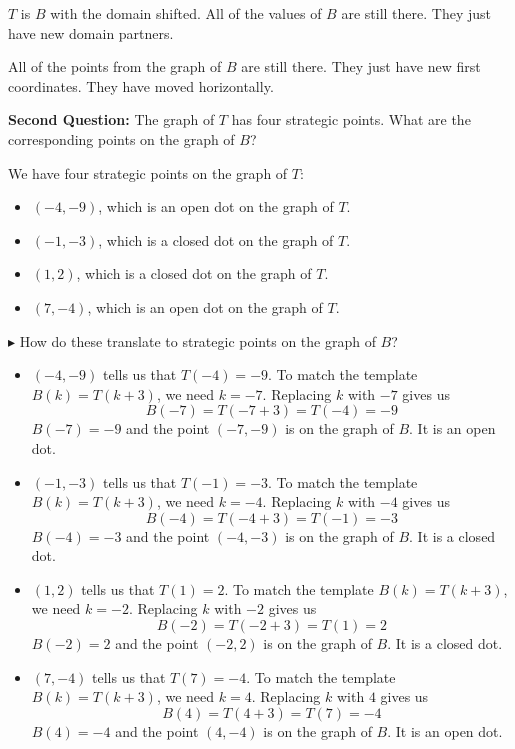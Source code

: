 \documentclass{ximera}
\begin{document}
$T$ is $B$ with the domain shifted. All of the values of $B$ are still there. They just have new domain partners.  

All of the points from the graph of $B$ are still there.  They just have new first coordinates.  They have moved horizontally.



\textbf{\textcolor{purple!85!blue}{Second Question:}}  The graph of $T$ has four strategic points.  What are the corresponding points on the graph of $B$?


We have four strategic points on the graph of $T$: 

\begin{itemize}

\item $(-4, -9)$, which is an open dot on the graph of $T$.
\item $(-1, -3)$, which is a closed dot on the graph of $T$.
\item $(1, 2)$, which is a closed dot on the graph of $T$.
\item $(7, -4)$, which is an open dot on the graph of $T$.

\end{itemize}


\textbf{\textcolor{blue!55!black}{$\blacktriangleright$}} How do these translate to strategic points on the graph of $B$?


\begin{itemize}

\item $(-4, -9)$ tells us that $T(-4) = -9$.   
To match the template $B(k) = T(k+3)$, we need $k=-7$.  Replacing $k$ with $-7$ gives us
\[ B(-7) = T(-7 + 3) = T(-4) = -9\]
$B(-7) = -9$ and the point $(-7, -9)$ is on the graph of $B$. It is an open dot. 


\item $(-1, -3)$ tells us that $T(-1) = -3$.   
To match the template $B(k) = T(k+3)$, we need $k=-4$.  Replacing $k$ with $-4$ gives us
\[ B(-4) = T(-4 + 3) = T(-1) = -3\]
$B(-4) = -3$ and the point $(-4, -3)$ is on the graph of $B$. It is a closed dot. 


\item $(1, 2)$ tells us that $T(1) = 2$.   
To match the template $B(k) = T(k+3)$, we need $k=-2$.  Replacing $k$ with $-2$ gives us
\[ B(-2) = T(-2 + 3) = T(1) = 2\]
$B(-2) = 2$ and the point $(-2, 2)$ is on the graph of $B$. It is a closed dot. 


\item $(7, -4)$ tells us that $T(7) = -4$.   
To match the template $B(k) = T(k+3)$, we need $k=4$.  Replacing $k$ with $4$ gives us
\[ B(4) = T(4 + 3) = T(7) = -4\]
$B(4) = -4$ and the point $(4, -4)$ is on the graph of $B$. It is an open dot.


\end{itemize}
\end{document}
